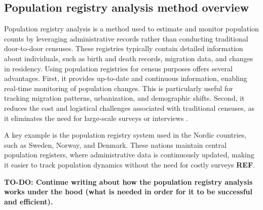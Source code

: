 \subsection{Population registry analysis method overview}

Population registry analysis is a method used to estimate and monitor population counts by leveraging administrative records rather than conducting traditional door-to-door censuses. These registries typically contain detailed information about individuals, such as birth and death records, migration data, and changes in residency. Using population registries for census purposes offers several advantages. First, it provides up-to-date and continuous information, enabling real-time monitoring of population changes. This is particularly useful for tracking migration patterns, urbanization, and demographic shifts. Second, it reduces the cost and logistical challenges associated with traditional censuses, as it eliminates the need for large-scale surveys or interviews \cite{RegisterBasedCensusStatistics}.

A key example is the population registry system used in the Nordic countries, such as Sweden, Norway, and Denmark. These nations maintain central population registers, where administrative data is continuously updated, making it easier to track population dynamics without the need for costly surveys \textbf{REF}.

\textbf{TO-DO: Continue writing about how the population registry analysis works under the hood (what is needed in order for it to be successful and efficient).}